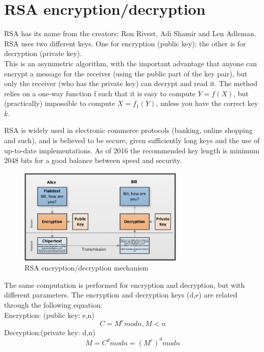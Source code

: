 \section{RSA encryption/decryption}
RSA has its name from the creators; Ron Rivest, Adi Shamir and Len Adleman. RSA uses two different keys. One for encryption (public key); the other is for decryption (private key). \\
This is an asymmetric algorithm, with the important advantage that anyone can encrypt a message for the receiver (using the public part of the key pair), but only the receiver (who has the private key) can decrypt and read it. The method relies on a one-way function f such that it is easy to compute $Y=f(X)$, but (practically) impossible to compute $X=f_1(Y)$, unless you have the correct key $k$.

RSA is widely used in electronic commerce protocols (banking, online shopping and such), and is believed to be secure, given sufficiently long keys and the use of up-to-date implementations. As of 2016 the recommended key length is minimum 2048 bits for a good balance between speed and security.

\begin{figure}[H]
\centering
\includegraphics[width=0.7\textwidth]{images/rsa.PNG}
\caption{RSA encryption/decryption mechanism}
\label{fig:rsa}
\end{figure}

The same computation is performed for encryption and decryption, but with different parameters. The encryption and decryption keys (d,e) are related through the following equation:\\
Encryption: (public key: {e,n})
\begin{equation}
    C=M^e mod n, M<n
\end{equation}
Decryption:(private key: {d,n})
\begin{equation}
    M=C^d mod n = (M^e)^d mod n
\end{equation}

